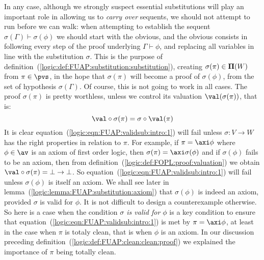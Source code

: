 In any case, although we strongly suspect essential substitutions
will play an important role in allowing us to {\em carry over}
sequents, we should not attempt to run before we can walk: when
attempting to establish the sequent
$\sigma(\Gamma)\vdash\sigma(\phi)$ we should start with the obvious,
and the obvious consists in following every step of the proof
underlying $\Gamma\vdash\phi$, and replacing all variables in line
with the substitution $\sigma$. This is the purpose of
definition~(\ref{logic:def:FUAP:substitution:substitution}),
creating $\sigma(\pi)\in{\bf\Pi}(W)$ from $\pi\in\pvs$, in the hope
that $\sigma(\pi)$ will become a proof of $\sigma(\phi)$, from the
set of hypothesis $\sigma(\Gamma)$. Of course, this is not going to
work in all cases. The proof $\sigma(\pi)$ is pretty worthless,
unless we control its valuation $\val(\sigma(\pi))$, that is:
    \begin{equation}\label{logic:eqn:FUAP:validsub:intro:1}
    \val\circ\sigma(\pi)=\sigma\circ\val(\pi)
    \end{equation}
It is clear equation~(\ref{logic:eqn:FUAP:validsub:intro:1}) will
fail unless $\sigma:V\to W$ has the right properties in relation to
$\pi$. For example, if $\pi=\axi\phi$ where $\phi\in\av$ is an axiom
of first order logic, then $\sigma(\pi)=\axi\sigma(\phi)$ and if
$\sigma(\phi)$ fails to be an axiom, then from
definition~(\ref{logic:def:FOPL:proof:valuation}) we obtain
$\val\circ\sigma(\pi)=\bot\to\bot$. So
equation~(\ref{logic:eqn:FUAP:validsub:intro:1}) will fail unless
$\sigma(\phi)$ is itself an axiom. We shall see later in
lemma~(\ref{logic:lemma:FUAP:substitution:axiom}) that
$\sigma(\phi)$ is indeed an axiom, provided $\sigma$ is valid for
$\phi$. It is not difficult to design a counterexample otherwise. So
here is a case when the condition {\em $\sigma$ is valid for $\phi$}
is a key condition to ensure that
equation~(\ref{logic:eqn:FUAP:validsub:intro:1}) is met by
$\pi=\axi\phi$, at least in the case when $\pi$ is totaly clean,
that is when $\phi$ is an axiom. In our discussion preceding
definition~(\ref{logic:def:FUAP:clean:clean:proof}) we explained the
importance of $\pi$ being totally clean.

